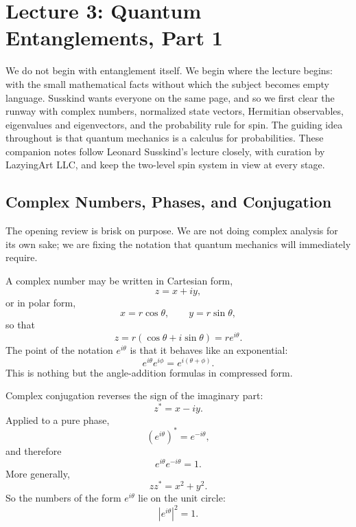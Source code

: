 \chapter{Lecture 3: Quantum Entanglements, Part 1}

We do not begin with entanglement itself. We begin where the lecture begins: with the small mathematical facts without which the subject becomes empty language. Susskind wants everyone on the same page, and so we first clear the runway with complex numbers, normalized state vectors, Hermitian observables, eigenvalues and eigenvectors, and the probability rule for spin. The guiding idea throughout is that quantum mechanics is a calculus for probabilities. These companion notes follow Leonard Susskind's lecture closely, with curation by LazyingArt LLC, and keep the two-level spin system in view at every stage.

\section{Complex Numbers, Phases, and Conjugation}

The opening review is brisk on purpose. We are not doing complex analysis for its own sake; we are fixing the notation that quantum mechanics will immediately require.

A complex number may be written in Cartesian form,
\begin{equation}
z=x+iy,
\end{equation}
or in polar form,
\begin{equation}
x=r\cos\theta,\qquad y=r\sin\theta,
\end{equation}
so that
\begin{equation}
z=r(\cos\theta+i\sin\theta)=re^{i\theta}.
\end{equation}
The point of the notation \(e^{i\theta}\) is that it behaves like an exponential:
\begin{equation}
e^{i\theta}e^{i\phi}=e^{i(\theta+\phi)}.
\end{equation}
This is nothing but the angle-addition formulas in compressed form.

Complex conjugation reverses the sign of the imaginary part:
\begin{equation}
z^*=x-iy.
\end{equation}
Applied to a pure phase,
\begin{equation}
(e^{i\theta})^*=e^{-i\theta},
\end{equation}
and therefore
\begin{equation}
e^{i\theta}e^{-i\theta}=1.
\end{equation}
More generally,
\begin{equation}
zz^*=x^2+y^2.
\end{equation}
So the numbers of the form \(e^{i\theta}\) lie on the unit circle:
\begin{equation}
|e^{i\theta}|^2=1.
\end{equation}


